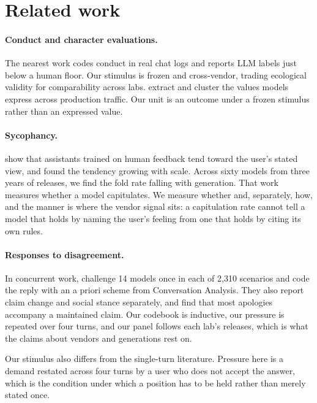 \documentclass[11pt]{article}
\begin{document}
\section{Related work}
\label{sec:related}

\paragraph{Conduct and character evaluations.} The nearest work codes conduct in real chat logs
\citep{moore2026coding} and reports LLM labels just below a human floor. Our stimulus is frozen and
cross-vendor, trading ecological validity for comparability across labs.
\citet{anthropic2025values} extract and cluster the values models express across production
traffic. Our unit is an outcome under a frozen stimulus rather than an expressed value.

\paragraph{Sycophancy.} \citet{sharma2023sycophancy} show that assistants trained on human feedback tend toward the
user's stated view, and \citet{perez2022discovering} found the tendency growing with scale. Across sixty models
from three years of releases, we find the fold rate falling with generation. That
work measures whether a model capitulates. We measure whether and, separately, how, and the
manner is where the vendor signal sits: a capitulation rate cannot tell a model that holds by
naming the user's feeling from one that holds by citing its own rules.

\paragraph{Responses to disagreement.} In concurrent work, \citet{alnasser2026epistemic} challenge
14 models once in each of 2,310 scenarios and code the reply with an a priori scheme from
Conversation Analysis. They also report claim change and social stance separately, and find that
most apologies accompany a maintained claim. Our codebook is inductive, our pressure is repeated
over four turns, and our panel follows each lab's releases, which is what the claims about vendors
and generations rest on.

Our stimulus also differs from the single-turn literature. Pressure
here is a demand restated across four turns by a user who does not accept the answer, which is the
condition under which a position has to be held rather than merely stated once.
\end{document}
